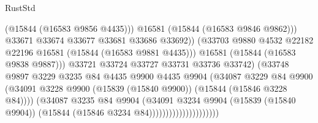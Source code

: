 \begin{lexlean}{RustStd}
\begin{coremodule}
                                                (@15844 (@16583 @9856 @4435)))
                                              @16581
                                              (@15844 (@16583 @9846 @9862)))
                                            @33671
                                            @33674
                                            @33677
                                            @33681
                                            @33686
                                            @33692))
                                        (@33703
                                          @9880
                                          @4532
                                          @22182
                                          @22196
                                          @16581
                                          (@15844 (@16583 @9881 @4435)))
                                        @16581
                                        (@15844 (@16583 @9838 @9887)))
                                      @33721
                                      @33724
                                      @33727
                                      @33731
                                      @33736
                                      @33742)
                                    (@33748
                                      @9897
                                      @3229
                                      @3235
                                      @84
                                      @4435
                                      @9900
                                      @4435
                                      @9904
                                      (@34087
                                        @3229
                                        @84
                                        @9900
                                        (@34091
                                          @3228
                                          @9900
                                          (@15839 (@15840 @9900))
                                          (@15844 (@15846 @3228 @84))))
                                      (@34087
                                        @3235
                                        @84
                                        @9904
                                        (@34091
                                          @3234
                                          @9904
                                          (@15839 (@15840 @9904))
                                          (@15844 (@15846 @3234 @84)))))))))))))))))))))

\end{coremodule}
\end{lexlean}
